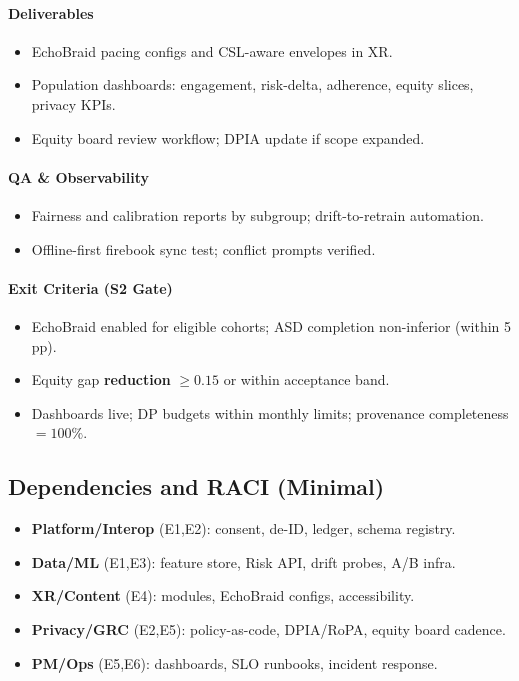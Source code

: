 \documentclass[11pt]{article}
\theoremstyle{plain}
\begin{document}
\paragraph{Deliverables}
\begin{itemize}
  \item EchoBraid pacing configs and CSL-aware envelopes in XR.
  \item Population dashboards: engagement, risk-delta, adherence, equity slices, privacy KPIs.
  \item Equity board review workflow; DPIA update if scope expanded.
\end{itemize}
\paragraph{QA \& Observability}
\begin{itemize}
  \item Fairness and calibration reports by subgroup; drift-to-retrain automation.
  \item Offline-first firebook sync test; conflict prompts verified.
\end{itemize}
\paragraph{Exit Criteria (S2 Gate)}
\begin{itemize}
  \item EchoBraid enabled for eligible cohorts; ASD completion non-inferior (within 5 pp).
  \item Equity gap \textbf{reduction} $\mathbf{\ge 0.15}$ or within acceptance band.
  \item Dashboards live; DP budgets within monthly limits; provenance completeness $=100\%$.
\end{itemize}

\subsection{Dependencies and RACI (Minimal)}
\begin{itemize}
  \item \textbf{Platform/Interop} (E1,E2): consent, de-ID, ledger, schema registry.
  \item \textbf{Data/ML} (E1,E3): feature store, Risk API, drift probes, A/B infra.
  \item \textbf{XR/Content} (E4): modules, EchoBraid configs, accessibility.
  \item \textbf{Privacy/GRC} (E2,E5): policy-as-code, DPIA/RoPA, equity board cadence.
  \item \textbf{PM/Ops} (E5,E6): dashboards, SLO runbooks, incident response.
\end{itemize}
\end{document}
